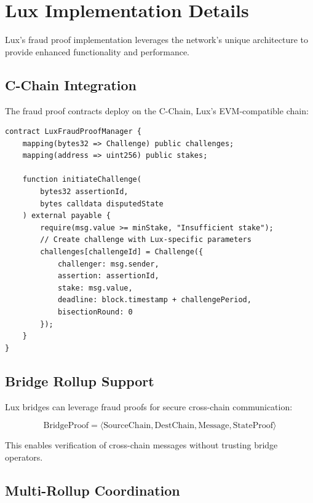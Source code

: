 \section{Lux Implementation Details}


Lux's fraud proof implementation leverages the network's unique architecture to provide enhanced functionality and performance.

\subsection{C-Chain Integration}

The fraud proof contracts deploy on the C-Chain, Lux's EVM-compatible chain:

\begin{lstlisting}[language=Solidity, caption=Lux Fraud Proof Manager]
contract LuxFraudProofManager {
    mapping(bytes32 => Challenge) public challenges;
    mapping(address => uint256) public stakes;
    
    function initiateChallenge(
        bytes32 assertionId,
        bytes calldata disputedState
    ) external payable {
        require(msg.value >= minStake, "Insufficient stake");
        // Create challenge with Lux-specific parameters
        challenges[challengeId] = Challenge({
            challenger: msg.sender,
            assertion: assertionId,
            stake: msg.value,
            deadline: block.timestamp + challengePeriod,
            bisectionRound: 0
        });
    }
}
\end{lstlisting}

\subsection{Bridge Rollup Support}

Lux bridges can leverage fraud proofs for secure cross-chain communication:

\begin{equation}
\text{BridgeProof} = \langle \text{SourceChain}, \text{DestChain}, \text{Message}, \text{StateProof} \rangle
\end{equation}

This enables verification of cross-chain messages without trusting bridge operators.

\subsection{Multi-Rollup Coordination}


